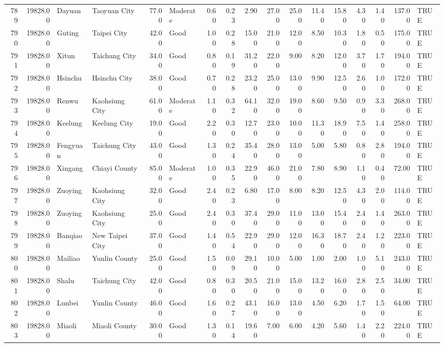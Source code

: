 \begin{table}[ht]
\begin{tabular}{rrllrlrrrrrrrrrrl}
  789 & 19828.00 & Dayuan & Taoyuan City & 77.00 & Moderate & 0.60 & 0.23 & 2.90 & 27.00 & 25.00 & 11.40 & 15.80 & 4.30 & 1.40 & 137.00 & TRUE \\ 
  790 & 19828.00 & Guting & Taipei City & 42.00 & Good & 1.00 & 0.28 & 15.00 & 21.00 & 12.00 & 8.50 & 10.30 & 1.80 & 0.50 & 175.00 & TRUE \\ 
  791 & 19828.00 & Xitun & Taichung City & 34.00 & Good & 0.80 & 0.19 & 31.20 & 22.00 & 9.00 & 8.20 & 12.00 & 3.70 & 1.70 & 194.00 & TRUE \\ 
  792 & 19828.00 & Hsinchu & Hsinchu City & 38.00 & Good & 0.70 & 0.28 & 23.20 & 25.00 & 13.00 & 9.90 & 12.50 & 2.60 & 1.00 & 172.00 & TRUE \\ 
  793 & 19828.00 & Renwu & Kaohsiung City & 61.00 & Moderate & 1.10 & 0.32 & 64.10 & 32.00 & 19.00 & 8.60 & 9.50 & 0.90 & 3.30 & 268.00 & TRUE \\ 
  794 & 19828.00 & Keelung & Keelung City & 19.00 & Good & 2.20 & 0.30 & 12.70 & 23.00 & 10.00 & 11.30 & 18.90 & 7.50 & 1.40 & 258.00 & TRUE \\ 
  795 & 19828.00 & Fengyuan & Taichung City & 43.00 & Good & 1.30 & 0.24 & 35.40 & 28.00 & 13.00 & 5.00 & 5.80 & 0.80 & 2.80 & 194.00 & TRUE \\ 
  796 & 19828.00 & Xingang & Chiayi County & 85.00 & Moderate & 1.00 & 0.35 & 22.90 & 46.00 & 21.00 & 7.80 & 8.90 & 1.10 & 0.40 & 72.00 & TRUE \\ 
  797 & 19828.00 & Zuoying & Kaohsiung City & 32.00 & Good & 2.40 & 0.23 & 6.80 & 17.00 & 8.00 & 8.20 & 12.50 & 4.30 & 2.00 & 114.00 & TRUE \\ 
  798 & 19828.00 & Zuoying & Kaohsiung City & 25.00 & Good & 2.40 & 0.30 & 37.40 & 29.00 & 11.00 & 13.00 & 15.40 & 2.40 & 1.40 & 263.00 & TRUE \\ 
  799 & 19828.00 & Banqiao & New Taipei City & 37.00 & Good & 1.40 & 0.54 & 22.90 & 29.00 & 12.00 & 16.30 & 18.70 & 2.40 & 1.20 & 223.00 & TRUE \\ 
  800 & 19828.00 & Mailiao & Yunlin County & 25.00 & Good & 1.50 & 0.09 & 29.10 & 10.00 & 5.00 & 1.00 & 2.00 & 1.00 & 5.10 & 243.00 & TRUE \\ 
  801 & 19828.00 & Shalu & Taichung City & 42.00 & Good & 0.80 & 0.30 & 20.50 & 21.00 & 15.00 & 13.20 & 16.00 & 2.80 & 2.50 & 34.00 & TRUE \\ 
  802 & 19828.00 & Lunbei & Yunlin County & 46.00 & Good & 1.60 & 0.27 & 43.10 & 16.00 & 13.00 & 4.50 & 6.20 & 1.70 & 1.50 & 64.00 & TRUE \\ 
  803 & 19828.00 & Miaoli & Miaoli County & 30.00 & Good & 1.30 & 0.14 & 19.60 & 7.00 & 6.00 & 4.20 & 5.60 & 1.40 & 2.20 & 224.00 & TRUE \\ 

\end{tabular}
\end{table}
